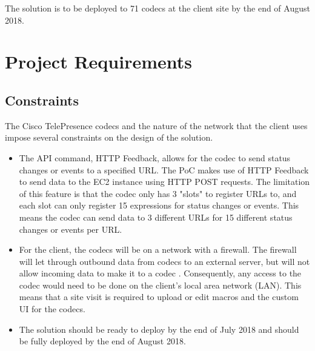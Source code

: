 \documentclass[letterpaper,12pt]{article}
\begin{document}
The solution is to be deployed to 71 codecs at the client site by the end of August 2018.

\section{Project Requirements}

\subsection{Constraints}
The Cisco TelePresence codecs and the nature of the network that the client uses impose several constraints on the design of the solution.

\begin{itemize}
	\item The API command, HTTP Feedback, allows for the codec to send status changes or events to a specified URL. The PoC makes use of HTTP Feedback to send data to the EC2 instance using HTTP POST requests. The limitation of this feature is that the codec only has 3 "slots" to register URLs to, and each slot can only register 15 expressions for status changes or events. This means the codec can send data to 3 different URLs for 15 different status changes or events per URL.
	\item For the client, the codecs will be on a network with a firewall. The firewall will let through outbound data from codecs to an external server, but will not allow incoming data to make it to a codec \cite{firewall}. Consequently, any access to the codec would need to be done on the client's local area network (LAN). This means that a site visit is required to upload or edit macros and the custom UI for the codecs. 
    \item The solution should be ready to deploy by the end of July 2018 and should be fully deployed by the end of August 2018.
\end{itemize}
\end{document}
